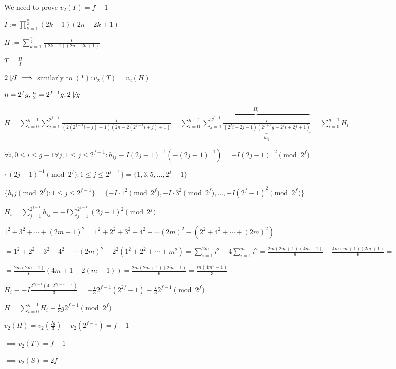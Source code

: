 \documentclass{article}
\begin{document}
We need to prove \( v_2(T) = f - 1 \)

\( I := \prod_{k=1}^{\frac{n}{2}} (2k-1)(2n-2k+1) \)

\( H := \sum_{k=1}^{\frac{n}{2}}\frac{I}{(2k-1)(2n-2k+1)} \)

\( T = \frac{H}{I} \)

\( 2 \not\mid I \implies \) similarly to \( (*): v_2(T) = v_2(H) \)

\( n=2^fg, \frac{n}{2} = 2^{f-1}g, 2 \not\mid g \)

\( H = \sum_{i=0}^{g-1}\sum_{j=1}^{2^{f-1}} \frac{I}{(2(2^{f-1} i + j) - 1)(2n-2(2^{f-1} i + j) + 1)} = \sum_{i=0}^{g-1}\overbrace{\sum_{j=1}^{2^{f-1}} \underbrace{\frac{I}{(2^{f} i + 2j - 1)(2^{f+1}g-2^{f} i + 2j + 1)}}_{h_{ij}}}^{H_i} = \sum_{i=0}^{g-1} H_i \)

\( \forall i, 0 \leq i \leq g - 1 \forall j, 1 \leq j \leq 2^{f-1}: h_{ij} \equiv I (2j-1)^{-1} (-(2j-1)^{-1}) = -I (2j-1)^{-2} \pmod {2^f} \)

\( \{ (2j-1)^{-1} \pmod {2^f}: 1 \leq j \leq 2^{f-1} \} = \{ 1, 3, 5, \ldots, 2^f - 1 \} \)

\( \{ h_ij \pmod{2^f}: 1 \leq j \leq 2^{f-1} \} = \{ -I\cdot 1^2 \pmod{2^f}, -I\cdot 3^2 \pmod{2^f}, \ldots, -I (2^f-1)^2 \pmod{2^f} \} \)

\( H_i = \sum_{j=1}^{2^{f-1}} h_{ij} \equiv -I \sum_{j=1}^{2^{f-1}} (2j-1)^2 \pmod{2^f} \)

\( 1^2 + 3^2 + \cdots + (2m-1)^2 = 1^2 + 2^2 + 3^2 + 4^2 + \cdots (2m)^2 - (2^2 + 4^2 + \cdots + (2m)^2) = \)

\( = 1^2 + 2^2 + 3^2 + 4^2 + \cdots (2m)^2 - 2^2 (1^2 + 2^2 + \cdots + m^2) = \sum_{i=1}^{2m} i^2 - 4 \sum_{i=1}^m i^2 = \frac{2m(2m+1)(4m+1)}{6} - \frac{4m(m+1)(2m+1)}{6} = \)

\( = \frac{2m(2m+1)}{6}(4m+1 - 2(m+1)) = \frac{2m(2m+1)(2m-1)}{6} = \frac{m(4m^2-1)}{3} \)

\( H_i \equiv -I \frac{2^{2f-1}(4 \cdot 2^{2f-2}-1)}{3} = -\frac{I}{3} 2^{f-1}(2^{2f} - 1) \equiv \frac{I}{3} 2^{f-1} \pmod{2^f} \)

\( H = \sum_{i=0}^{g-1} H_i \equiv \frac{I}{3}g 2^{f-1} \pmod{2^f} \)

\( v_2(H) = v_2(\frac{Ig}{3}) + v_2(2^{f-1}) = f - 1 \)

\( \implies v_2(T) = f-1 \)

\( \implies v_2(S) = 2f \)
\end{document}
